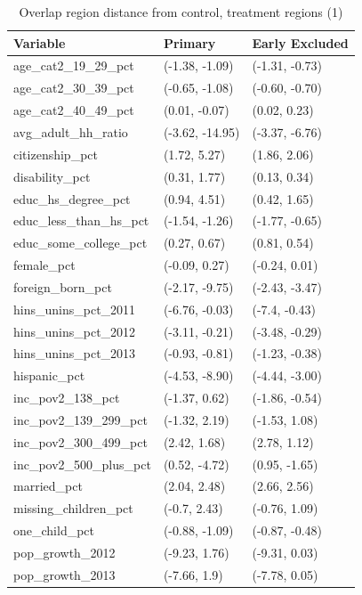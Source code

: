 \documentclass[12pt]{article}
\begin{document}
\begin{table}[ht]
\centering
\begin{tabular}{lll}
  \toprule
Variable & Primary & Early Excluded \\ 
  \midrule
age\_cat2\_19\_29\_pct & (-1.38, -1.09) & (-1.31, -0.73) \\ 
  age\_cat2\_30\_39\_pct & (-0.65, -1.08) & (-0.60, -0.70) \\ 
  age\_cat2\_40\_49\_pct & (0.01, -0.07) & (0.02, 0.23) \\ 
  avg\_adult\_hh\_ratio & (-3.62, -14.95) & (-3.37, -6.76) \\ 
  citizenship\_pct & (1.72, 5.27) & (1.86, 2.06) \\ 
  disability\_pct & (0.31, 1.77) & (0.13, 0.34) \\ 
  educ\_hs\_degree\_pct & (0.94, 4.51) & (0.42, 1.65) \\ 
  educ\_less\_than\_hs\_pct & (-1.54, -1.26) & (-1.77, -0.65) \\ 
  educ\_some\_college\_pct & (0.27, 0.67) & (0.81, 0.54) \\ 
  female\_pct & (-0.09, 0.27) & (-0.24, 0.01) \\ 
  foreign\_born\_pct & (-2.17, -9.75) & (-2.43, -3.47) \\ 
  hins\_unins\_pct\_2011 & (-6.76, -0.03) & (-7.4, -0.43) \\ 
  hins\_unins\_pct\_2012 & (-3.11, -0.21) & (-3.48, -0.29) \\ 
  hins\_unins\_pct\_2013 & (-0.93, -0.81) & (-1.23, -0.38) \\ 
  hispanic\_pct & (-4.53, -8.90) & (-4.44, -3.00) \\ 
  inc\_pov2\_138\_pct & (-1.37, 0.62) & (-1.86, -0.54) \\ 
  inc\_pov2\_139\_299\_pct & (-1.32, 2.19) & (-1.53, 1.08) \\ 
  inc\_pov2\_300\_499\_pct & (2.42, 1.68) & (2.78, 1.12) \\ 
  inc\_pov2\_500\_plus\_pct & (0.52, -4.72) & (0.95, -1.65) \\ 
  married\_pct & (2.04, 2.48) & (2.66, 2.56) \\ 
  missing\_children\_pct & (-0.7, 2.43) & (-0.76, 1.09) \\ 
  one\_child\_pct & (-0.88, -1.09) & (-0.87, -0.48) \\ 
  pop\_growth\_2012 & (-9.23, 1.76) & (-9.31, 0.03) \\ 
  pop\_growth\_2013 & (-7.66, 1.9) & (-7.78, 0.05) \\ 
   \bottomrule
\end{tabular}
    \caption{Overlap region distance from control, treatment regions (1)}
    \label{tab:oatedist1}
\end{table}
\end{document}
